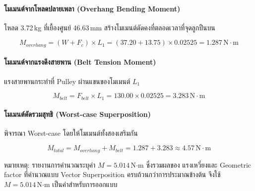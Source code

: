 \paragraph{โมเมนต์จากโหลดปลายเพลา (Overhang Bending Moment)}

โหลด 3.72\,kg ที่เยื้องศูนย์ 46.63\,mm
สร้างโมเมนต์ดัดคงที่ตลอดเวลาที่จุดลูกปืนบน

\begin{equation}
  M_{overhang} = (W + F_c) \times L_1
               = (37.20 + 13.75) \times 0.02525
               = 1.287\,\text{N}\cdot\text{m}
  \label{eq:shaft_m_overhang}
\end{equation}

\paragraph{โมเมนต์จากแรงดึงสายพาน (Belt Tension Moment)}

แรงสายพานกระทำที่ Pulley ผ่านแขนของโมเมนต์ $L_1$

\begin{equation}
  M_{belt} = F_{belt} \times L_1
           = 130.00 \times 0.02525
           = 3.283\,\text{N}\cdot\text{m}
  \label{eq:shaft_m_belt}
\end{equation}

\paragraph{โมเมนต์ดัดรวมสุทธิ (Worst-case Superposition)}

พิจารณา Worst-case โดยให้โมเมนต์ทั้งสองเสริมกัน

\begin{equation}
  M_{total} = M_{overhang} + M_{belt}
            = 1.287 + 3.283
            \approx 4.57\,\text{N}\cdot\text{m}
  \label{eq:shaft_m_total}
\end{equation}


หมายเหตุ: รายงานการคำนวณระบุค่า
$M = 5.014$\,N$\cdot$m ซึ่งรวมผลของ
แรงเหวี่ยงและ Geometric factor
ที่คำนวณแบบ Vector Superposition
ครบถ้วนกว่าการประมาณข้างต้น
จึงใช้ $M = 5.014$\,N$\cdot$m
เป็นค่าสำหรับการออกแบบ


